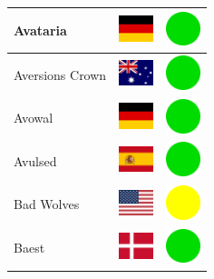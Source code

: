 \documentclass[12pt, a4paper, twoside]{report}
\begin{document}
\begin{center}
\begin{longtable}{|p{5cm}|p{2cm}|p{2cm}|}
Avataria & \includegraphics[width=1cm]{4x3/de} & \includegraphics[width=1cm]{likes/y} \\ \hline
Aversions Crown & \includegraphics[width=1cm]{4x3/au} & \includegraphics[width=1cm]{likes/y} \\ \hline
Avowal & \includegraphics[width=1cm]{4x3/de} & \includegraphics[width=1cm]{likes/y} \\ \hline
Avulsed & \includegraphics[width=1cm]{4x3/es} & \includegraphics[width=1cm]{likes/y} \\ \hline
Bad Wolves & \includegraphics[width=1cm]{4x3/us} & \includegraphics[width=1cm]{likes/m} \\ \hline
Baest & \includegraphics[width=1cm]{4x3/dk} & \includegraphics[width=1cm]{likes/y} \\ \hline

\end{longtable}
\end{center}
\end{document}
